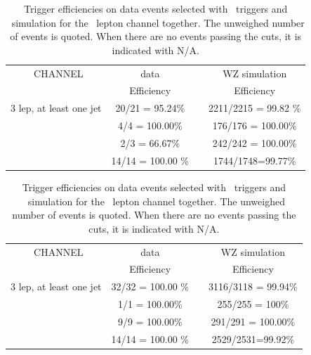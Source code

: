 \begin{table}[htbp]
	\centering
	\caption{Trigger efficiencies on data events selected with \Etmis\ triggers and \WZ\ simulation for the \eee\ lepton channel together. The unweighed number of events is quoted. When there are no events passing the cuts, it is indicated with N/A. }

	\begin{tabular}{cccc}
		\toprule 
		\eee\ CHANNEL & {data} & &{WZ simulation} \\ 
		& Efficiency &  & Efficiency \\
		\midrule
		3 lep,  at least one jet & 20/21 = 95.24\%  &  & 2211/2215 = 99.82 \% \\ 
		\STSR & 4/4 = 100.00\% & & 176/176 = 100.00\%  \\ 
		\TTSR & 2/3 = 66.67\% &  & 242/242 = 100.00\%  \\ 
		\WZCR & 14/14 = 100.00 \% &  & 1744/1748=99.77\%  \\ 
		\bottomrule
	\end{tabular} 
\end{table}
\begin{table}[htbp]
	\centering
	\caption{Trigger efficiencies on data events selected with \Etmis\ triggers and \WZ\ simulation for the \eemu\ lepton channel together. The unweighed number of events is quoted. When there are no events passing the cuts, it is indicated with N/A. }

	\begin{tabular}{cccc}
		\toprule
		\eemu\ CHANNEL & {data} & & {WZ simulation} \\ 
		& Efficiency &  & Efficiency  \\
		\midrule
		3 lep,  at least one jet & 32/32 = 100.00 \% & & 3116/3118 = 99.94\%  \\ 
		\STSR & 1/1 = 100.00\%& & 255/255 = 100\%  \\ 
		\TTSR & 9/9 = 100.00\% &  &291/291 = 100.00\%  \\ 
		\WZCR & 14/14 = 100.00 \% &  & 2529/2531=99.92\% \\ 
		\bottomrule
	\end{tabular} 
\end{table}	
